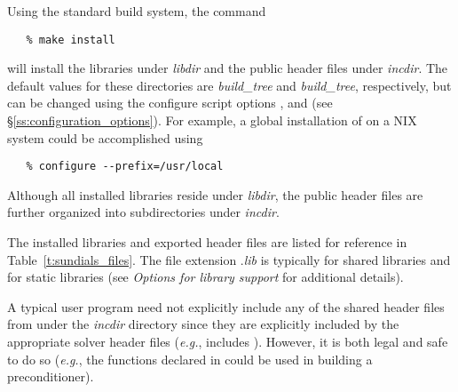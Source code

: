Using the standard {\sundials} build system, the command
\begin{verbatim}
   % make install
\end{verbatim}
will install the libraries under {\em libdir} and the public header
files under {\em incdir}. The default values for these directories are
{\em build\_tree} and {\em build\_tree},
respectively, but can be changed using the configure script options
,  and  (see
\S\ref{ss:configuration_options}). For example, a global installation
of {\sundials} on a {\sc *NIX} system could be accomplished using
\begin{verbatim}
   % configure --prefix=/usr/local
\end{verbatim}
Although all installed libraries reside under {\em libdir}, the public header files
are further organized into subdirectories under {\em incdir}.

The installed libraries and exported header files are listed for
reference in Table~\ref{t:sundials_files}.  The file extension .{\em lib}
is typically  for shared libraries and  for static libraries
(see {\em Options for library support} for additional details).

A typical user program need not explicitly include any of the shared
{\sundials} header files from under the {\em incdir}
directory since they are explicitly included by the appropriate solver
header files ({\em e.g.},  includes
). However, it is both legal and safe to do so
({\em e.g.}, the functions declared in  
could be used in building a preconditioner).

